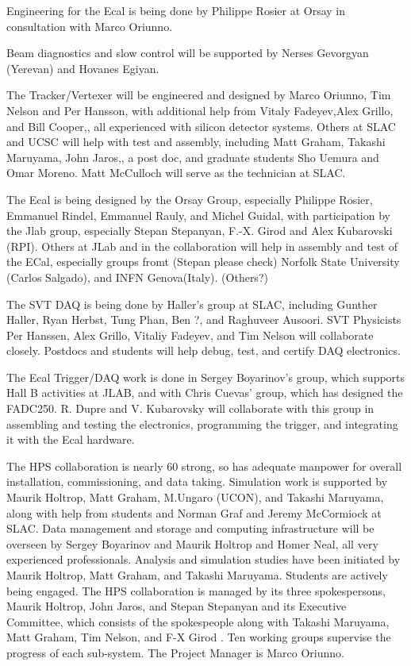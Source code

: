Engineering for the Ecal is being done by Philippe Rosier at Orsay in consultation with Marco Oriunno. 

Beam diagnostics and slow control will be supported by Nerses Gevorgyan (Yerevan) and Hovanes Egiyan.

 
The Tracker/Vertexer will be engineered and designed by Marco Oriunno, Tim Nelson and Per Hansson, with additional help from Vitaly Fadeyev,Alex Grillo, and Bill Cooper,, all experienced with silicon detector systems. Others at SLAC and UCSC will help with test and assembly, including Matt Graham, Takashi Maruyama, John Jaros,, a post doc, and graduate students Sho Uemura and Omar Moreno.  Matt McCulloch will serve as the  technician at SLAC. 

The Ecal is being designed by the Orsay Group, especially Philippe Rosier, Emmanuel Rindel, Emmanuel Rauly, and Michel Guidal, with participation by the Jlab group, especially Stepan Stepanyan, F.-X. Girod and Alex Kubarovski (RPI). Others at JLab and in the collaboration will help in assembly and test of the ECal, especially groups fromt (Stepan please check) Norfolk State University (Carlos Salgado), and INFN Genova(Italy). (Others?)
 
The SVT DAQ is being done by Haller's group at SLAC, including Gunther Haller, Ryan Herbst, Tung Phan, Ben ?, and Raghuveer Ausoori. SVT Physicists Per Hanssen, Alex Grillo, Vitaliy Fadeyev, and Tim Nelson will collaborate closely. Postdocs and students will help debug, test, and certify DAQ electronics. 

The Ecal Trigger/DAQ work is done in Sergey Boyarinov's group, which supports Hall B activities at JLAB, and with Chris Cuevas' group, which has designed the FADC250. R. Dupre and V. Kubarovsky will collaborate with this group in assembling and testing the electronics, programming the trigger, and integrating it with the Ecal hardware.

 The HPS collaboration is nearly 60 strong, so has adequate manpower for overall installation, commissioning, and data taking.  Simulation work is supported by Maurik Holtrop, Matt Graham, M.Ungaro (UCON), and Takashi Maruyama, along with help from students and Norman Graf  and Jeremy McCormiock at SLAC. Data management and storage and computing infrastructure will be overseen by Sergey Boyarinov and Maurik Holtrop and Homer Neal, all very experienced professionals. Analysis and simulation studies have been initiated by Maurik Holtrop, Matt Graham, and Takashi Maruyama. Students are actively being engaged. 
The HPS collaboration is managed by its three spokespersons, Maurik Holtrop, John Jaros, and Stepan Stepanyan and its Executive Committee, which consists of the spokespeople along with Takashi Maruyama, Matt Graham, Tim Nelson, and F-X Girod . Ten working groups supervise the progress of each sub-system. The Project Manager is Marco Oriunno.

